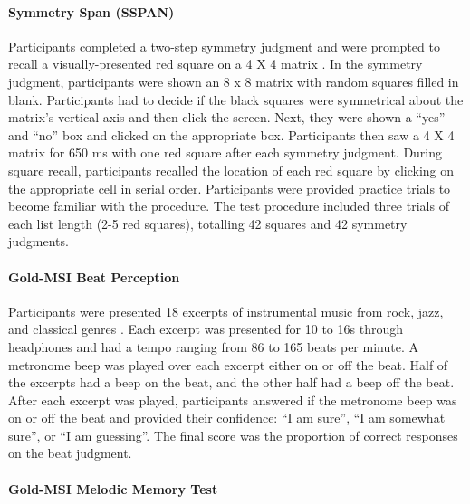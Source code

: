 \documentclass[]{book}
\let\oldparagraph\paragraph
\renewcommand{\paragraph}[1]{\oldparagraph{#1}\mbox{}}
\begin{document}
\hypertarget{symmetry-span-sspan}{%
\paragraph{Symmetry Span (SSPAN)}\label{symmetry-span-sspan}}

Participants completed a two-step symmetry judgment and were prompted to recall a visually-presented red square on a 4 X 4 matrix \citep{unsworthAutomatedVersionOperation2005}.
In the symmetry judgment, participants were shown an 8 x 8 matrix with random squares filled in blank.
Participants had to decide if the black squares were symmetrical about the matrix's vertical axis and then click the screen.
Next, they were shown a ``yes'' and ``no'' box and clicked on the appropriate box.
Participants then saw a 4 X 4 matrix for 650 ms with one red square after each symmetry judgment.
During square recall, participants recalled the location of each red square by clicking on the appropriate cell in serial order.
Participants were provided practice trials to become familiar with the procedure.
The test procedure included three trials of each list length (2-5 red squares), totalling 42 squares and 42 symmetry judgments.

\hypertarget{gold-msi-beat-perception}{%
\paragraph{Gold-MSI Beat Perception}\label{gold-msi-beat-perception}}

Participants were presented 18 excerpts of instrumental music from rock, jazz, and classical genres \citep{mullensiefenMusicalityNonMusiciansIndex2014}.
Each excerpt was presented for 10 to 16s through headphones and had a tempo ranging from 86 to 165 beats per
minute.
A metronome beep was played over each excerpt either on or off the beat.
Half of the excerpts had a beep on the beat, and the other half had a beep off the beat.
After each excerpt was played, participants answered if the metronome beep was on or off the beat and provided their confidence: ``I am sure'', ``I am somewhat sure'', or ``I am guessing''.
The final score was the proportion of correct responses on the beat judgment.

\hypertarget{gold-msi-melodic-memory-test}{%
\paragraph{Gold-MSI Melodic Memory Test}\label{gold-msi-melodic-memory-test}}
\end{document}
